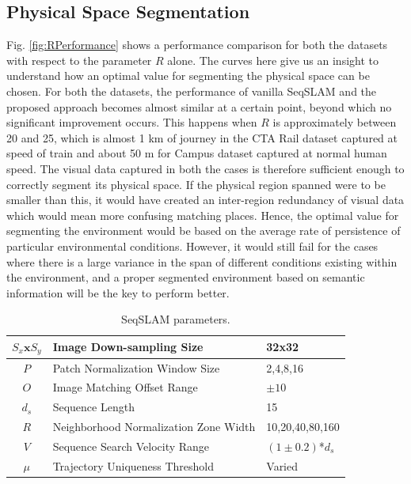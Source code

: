 \documentclass[letterpaper, 10 pt, conference]{ieeeconf}  %
\begin{document}
\subsection{Physical Space Segmentation}
Fig. \ref{fig:RPerformance} shows a performance comparison for both the datasets with respect to the parameter $R$ alone. The curves here give us an insight to understand how an optimal value for segmenting the physical space can be chosen. For both the datasets, the performance of vanilla SeqSLAM and the proposed approach becomes almost similar at a certain point, beyond which no significant improvement occurs. This happens when $R$ is approximately between 20 and 25, which is almost 1 km of journey in the CTA Rail dataset captured at speed of train and about 50 m for Campus dataset captured at normal human speed. The visual data captured in both the cases is therefore sufficient enough to correctly segment its physical space. If the physical region spanned were to be smaller than this, it would have created an inter-region redundancy of visual data which would mean more confusing matching places. Hence, the optimal value for segmenting the environment would be based on the average rate of persistence of particular environmental conditions. However, it would still fail for the cases where there is a large variance in the span of different conditions existing within the environment, and a proper segmented environment based on semantic information will be the key to perform better.



\begin{table}[!h]
\caption{SeqSLAM parameters.}
 \begin{tabular}{|c|p{4cm}|p{2.5cm}|}
 \hline
  $S_x\mathbf{x}S_y$ & Image Down-sampling Size & 32x32 \\
  \hline
  $P$ & Patch Normalization Window Size & {2,4,8,16} \\
  \hline
  $O$ & Image Matching Offset Range & $\pm10$ \\
  \hline
  $d_s$ & Sequence Length & 15 \\
  \hline
  $R$ & Neighborhood Normalization Zone Width & {10,20,40,80,160} \\
  \hline
  $V$ & Sequence Search Velocity Range & $(1\pm0.2)$*$d_s$ \\
  \hline
  $\mu$ & Trajectory Uniqueness Threshold & Varied \\
 \hline
 \end{tabular}
\label{table:seqSLAMParams}
\end{table}
\end{document}
